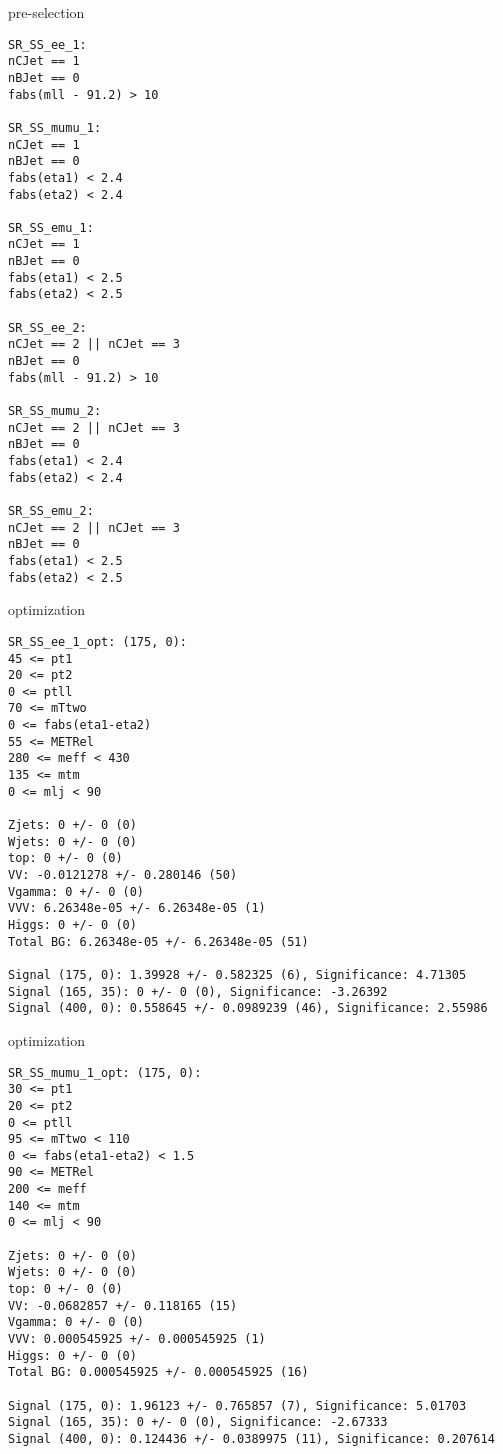 \begin{frame}[fragile]{pre-selection}
\tiny
\begin{verbatim}
SR_SS_ee_1:
nCJet == 1
nBJet == 0
fabs(mll - 91.2) > 10

SR_SS_mumu_1:
nCJet == 1
nBJet == 0
fabs(eta1) < 2.4
fabs(eta2) < 2.4

SR_SS_emu_1:
nCJet == 1
nBJet == 0
fabs(eta1) < 2.5
fabs(eta2) < 2.5

SR_SS_ee_2:
nCJet == 2 || nCJet == 3
nBJet == 0
fabs(mll - 91.2) > 10

SR_SS_mumu_2:
nCJet == 2 || nCJet == 3
nBJet == 0
fabs(eta1) < 2.4
fabs(eta2) < 2.4

SR_SS_emu_2:
nCJet == 2 || nCJet == 3
nBJet == 0
fabs(eta1) < 2.5
fabs(eta2) < 2.5
\end{verbatim}
\end{frame}

\begin{frame}[fragile]{optimization}
\tiny
\begin{verbatim}
SR_SS_ee_1_opt: (175, 0):
45 <= pt1
20 <= pt2
0 <= ptll
70 <= mTtwo
0 <= fabs(eta1-eta2)
55 <= METRel
280 <= meff < 430
135 <= mtm
0 <= mlj < 90

Zjets: 0 +/- 0 (0)
Wjets: 0 +/- 0 (0)
top: 0 +/- 0 (0)
VV: -0.0121278 +/- 0.280146 (50)
Vgamma: 0 +/- 0 (0)
VVV: 6.26348e-05 +/- 6.26348e-05 (1)
Higgs: 0 +/- 0 (0)
Total BG: 6.26348e-05 +/- 6.26348e-05 (51)

Signal (175, 0): 1.39928 +/- 0.582325 (6), Significance: 4.71305
Signal (165, 35): 0 +/- 0 (0), Significance: -3.26392
Signal (400, 0): 0.558645 +/- 0.0989239 (46), Significance: 2.55986
\end{verbatim}
\end{frame}

\begin{frame}[fragile]{optimization}
\tiny
\begin{verbatim}
SR_SS_mumu_1_opt: (175, 0):
30 <= pt1
20 <= pt2
0 <= ptll
95 <= mTtwo < 110
0 <= fabs(eta1-eta2) < 1.5
90 <= METRel
200 <= meff
140 <= mtm
0 <= mlj < 90

Zjets: 0 +/- 0 (0)
Wjets: 0 +/- 0 (0)
top: 0 +/- 0 (0)
VV: -0.0682857 +/- 0.118165 (15)
Vgamma: 0 +/- 0 (0)
VVV: 0.000545925 +/- 0.000545925 (1)
Higgs: 0 +/- 0 (0)
Total BG: 0.000545925 +/- 0.000545925 (16)

Signal (175, 0): 1.96123 +/- 0.765857 (7), Significance: 5.01703
Signal (165, 35): 0 +/- 0 (0), Significance: -2.67333
Signal (400, 0): 0.124436 +/- 0.0389975 (11), Significance: 0.207614
\end{verbatim}
\end{frame}

